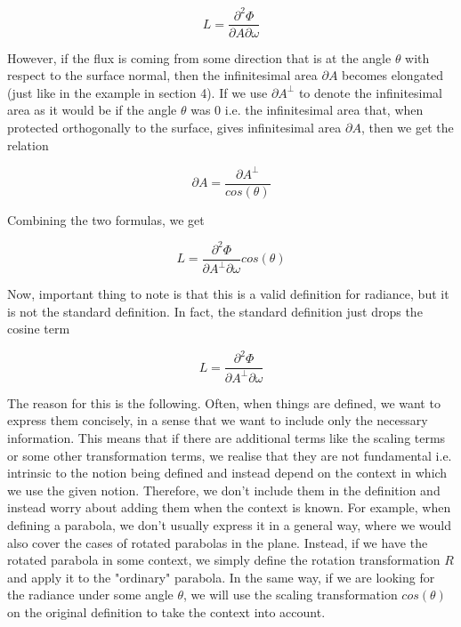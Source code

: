 \documentclass{article}
\begin{document}
\[ L = \frac{\partial^2 \Phi}{\partial A \partial \omega} \]

However, if the flux is coming from some direction that is at the angle $\theta$ with respect to the surface normal, then the infinitesimal area $\partial A$ becomes elongated (just like in the example in section 4). If we use $\partial A^\bot$ to denote the infinitesimal area as it would be if the angle $\theta$ was 0 i.e. the infinitesimal area that, when protected orthogonally to the surface, gives infinitesimal area $\partial A$, then we get the relation

\[ \partial A = \frac{\partial A^\bot}{cos(\theta)} \]

Combining the two formulas, we get

\[ L = \frac{\partial^2 \Phi }{\partial A^\bot \partial \omega} cos(\theta) \]

Now, important thing to note is that this is a valid definition for radiance, but it is not the standard definition. In fact, the standard definition just drops the cosine term

\[ L = \frac{\partial^2 \Phi }{\partial A^\bot \partial \omega} \]

The reason for this is the following. Often, when things are defined, we want to express them concisely, in a sense that we want to include only the necessary information. This means that if there are additional terms like the scaling terms or some other transformation terms, we realise that they are not fundamental i.e. intrinsic to the notion being defined and instead depend on the context in which we use the given notion. Therefore, we don't include them in the definition and instead worry about adding them when the context is known. For example, when defining a parabola, we don't usually express it in a general way, where we would also cover the cases of rotated parabolas in the plane. Instead, if we have the rotated parabola in some context, we simply define the rotation transformation $R$ and apply it to the "ordinary" parabola. In the same way, if we are looking for the radiance under some angle $\theta$, we will use the scaling transformation $cos(\theta)$ on the original definition to take the context into account.
\end{document}
